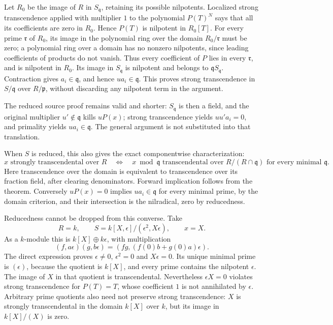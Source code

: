 Let \(R_0\) be the image of \(R\) in \(S_{\mathfrak q}\), retaining its possible nilpotents. Localized strong transcendence applied with multiplier \(1\) to the polynomial \(P(T)^N\) says that all its coefficients are zero in \(R_0\). Hence \(P(T)\) is nilpotent in \(R_0[T]\). For every prime \(\mathfrak r\) of \(R_0\), its image in the polynomial ring over the domain \(R_0/\mathfrak r\) must be zero; a polynomial ring over a domain has no nonzero nilpotents, since leading coefficients of products do not vanish. Thus every coefficient of \(P\) lies in every \(\mathfrak r\), and is nilpotent in \(R_0\). Its image in \(S_{\mathfrak q}\) is nilpotent and belongs to \(\mathfrak qS_{\mathfrak q}\). Contraction gives \(a_i\in\mathfrak q\), and hence \(ua_i\in\mathfrak q\). This proves strong transcendence in \(S/\mathfrak q\) over \(R/\mathfrak p\), without discarding any nilpotent term in the argument.

The reduced source proof remains valid and shorter: \(S_{\mathfrak q}\) is then a field, and the original multiplier \(u'\notin\mathfrak q\) kills \(uP(x)\); strong transcendence yields \(uu'a_i=0\), and primality yields \(ua_i\in\mathfrak q\). The general argument is not substituted into that translation.

When \(S\) is reduced, this also gives the exact componentwise characterization: \[
 x\text{ strongly transcendental over }R
 \quad\Longleftrightarrow\quad
 x\bmod\mathfrak q\text{ transcendental over }
 R/(R\cap\mathfrak q)
 \text{ for every minimal }\mathfrak q.
\] Here transcendence over the domain is equivalent to transcendence over its fraction field, after clearing denominators. Forward implication follows from the theorem. Conversely \(uP(x)=0\) implies \(ua_i\in\mathfrak q\) for every minimal prime, by the domain criterion, and their intersection is the nilradical, zero by reducedness.

Reducedness cannot be dropped from this converse. Take \[
 R=k,\qquad S=k[X,\epsilon]/(\epsilon^2,X\epsilon),\qquad x=X.
\] As a \(k\)-module this is \(k[X]\oplus k\epsilon\), with multiplication \[
 (f,a\epsilon)(g,b\epsilon)
  =(fg,(f(0)b+g(0)a)\epsilon).
\] The direct expression proves \(\epsilon\ne0\), \(\epsilon^2=0\) and \(X\epsilon=0\). Its unique minimal prime is \((\epsilon)\), because the quotient is \(k[X]\), and every prime contains the nilpotent \(\epsilon\). The image of \(X\) in that quotient is transcendental. Nevertheless \(\epsilon X=0\) violates strong transcendence for \(P(T)=T\), whose coefficient \(1\) is not annihilated by \(\epsilon\). Arbitrary prime quotients also need not preserve strong transcendence: \(X\) is strongly transcendental in the domain \(k[X]\) over \(k\), but its image in \(k[X]/(X)\) is zero.


